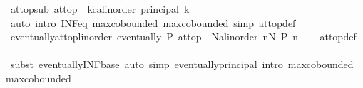 \begin{isabellebody}
\isanewline
{}\isamarkupfalse%
\ at{\isacharunderscore}{\kern0pt}top{\isacharunderscore}{\kern0pt}sub{\isacharcolon}{\kern0pt}\ {\isachardoublequoteopen}at{\isacharunderscore}{\kern0pt}top\ {\isacharequal}{\kern0pt}\ {\isacharparenleft}{\kern0pt}{\isasymSqinter}k{\isasymin}{\isacharbraceleft}{\kern0pt}c{\isacharcolon}{\kern0pt}{\isacharcolon}{\kern0pt}{\isacharprime}{\kern0pt}a{\isacharcolon}{\kern0pt}{\isacharcolon}{\kern0pt}linorder{\isachardot}{\kern0pt}{\isachardot}{\kern0pt}{\isacharbraceright}{\kern0pt}{\isachardot}{\kern0pt}\ principal\ {\isacharbraceleft}{\kern0pt}k\ {\isachardot}{\kern0pt}{\isachardot}{\kern0pt}{\isacharbraceright}{\kern0pt}{\isacharparenright}{\kern0pt}{\isachardoublequoteclose}\isanewline
%
\isadelimproof
\ \ %
\endisadelimproof
%
\isatagproof
{}\isamarkupfalse%
\ {\isacharparenleft}{\kern0pt}auto\ intro{\isacharbang}{\kern0pt}{\isacharcolon}{\kern0pt}\ INF{\isacharunderscore}{\kern0pt}eq\ max{\isachardot}{\kern0pt}cobounded{}\ max{\isachardot}{\kern0pt}cobounded{}\ simp{\isacharcolon}{\kern0pt}\ at{\isacharunderscore}{\kern0pt}top{\isacharunderscore}{\kern0pt}def{\isacharparenright}{\kern0pt}%
\endisatagproof
{\isafoldproof}%
%
\isadelimproof
\isanewline
%
\endisadelimproof
\isanewline
{}\isamarkupfalse%
\ eventually{\isacharunderscore}{\kern0pt}at{\isacharunderscore}{\kern0pt}top{\isacharunderscore}{\kern0pt}linorder{\isacharcolon}{\kern0pt}\ {\isachardoublequoteopen}eventually\ P\ at{\isacharunderscore}{\kern0pt}top\ {\isasymlongleftrightarrow}\ {\isacharparenleft}{\kern0pt}{\isasymexists}N{\isacharcolon}{\kern0pt}{\isacharcolon}{\kern0pt}{\isacharprime}{\kern0pt}a{\isacharcolon}{\kern0pt}{\isacharcolon}{\kern0pt}linorder{\isachardot}{\kern0pt}\ {\isasymforall}n{\isasymge}N{\isachardot}{\kern0pt}\ P\ n{\isacharparenright}{\kern0pt}{\isachardoublequoteclose}\isanewline
%
\isadelimproof
\ \ %
\endisadelimproof
%
\isatagproof
{}\isamarkupfalse%
\ at{\isacharunderscore}{\kern0pt}top{\isacharunderscore}{\kern0pt}def\isanewline
\ \ \isamarkupfalse%
\ {\isacharparenleft}{\kern0pt}subst\ eventually{\isacharunderscore}{\kern0pt}INF{\isacharunderscore}{\kern0pt}base{\isacharparenright}{\kern0pt}\ {\isacharparenleft}{\kern0pt}auto\ simp{\isacharcolon}{\kern0pt}\ eventually{\isacharunderscore}{\kern0pt}principal\ intro{\isacharcolon}{\kern0pt}\ max{\isachardot}{\kern0pt}cobounded{}\ max{\isachardot}{\kern0pt}cobounded{}{\isacharparenright}{\kern0pt}%
\endisatagproof
{\isafoldproof}%
%
\isadelimproof
\isanewline

\end{isabellebody}
